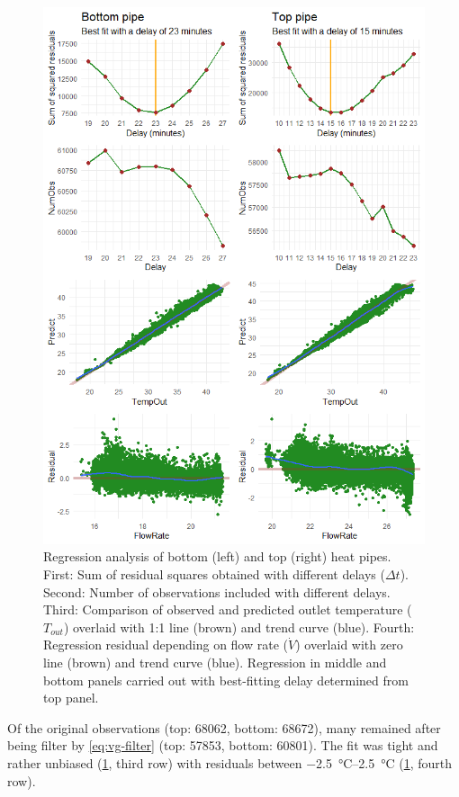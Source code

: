 \begin{figure} 
\centering
\includegraphics[width=\textwidth]{graphics/vg/vg-nordlys-regression.png}
\caption{Regression analysis of bottom (left) and top (right) heat pipes. First: Sum of residual squares obtained with different delays ($\Delta t$). Second: Number of observations included with different delays. Third: Comparison of observed and predicted outlet temperature ($T_{out}$) overlaid with 1:1 line (brown) and trend curve (blue). Fourth: Regression residual depending on flow rate ($\dot{V}$) overlaid with zero line (brown) and trend curve (blue). Regression in middle and bottom panels carried out with best-fitting delay determined from top panel.}
\label{fig:vg-nordlys-regression}
\end{figure}

\FloatBarrier
Of the original observations (top: \num{68062}, bottom: \num{68672}), many remained after being filter by \cref{eq:vg-filter} (top: \num{57853}, bottom: \num{60801}). The fit was tight and rather unbiased (\cref{fig:vg-nordlys-regression}, third row) with residuals between \SIrange{-2.5}{2.5}{\celsius} (\cref{fig:vg-nordlys-regression}, fourth row).


